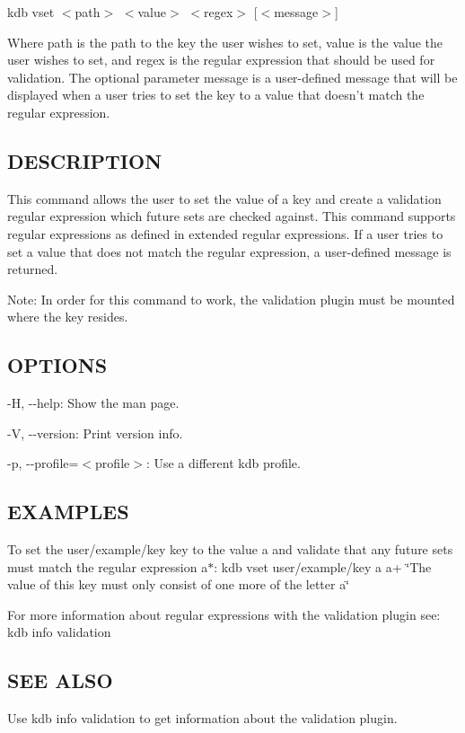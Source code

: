 {\ttfamily kdb vset $<$path$>$ $<$value$>$ $<$regex$>$ \mbox{[}$<$message$>$\mbox{]}}

Where {\ttfamily path} is the path to the key the user wishes to set, {\ttfamily value} is the value the user wishes to set, and {\ttfamily regex} is the regular expression that should be used for validation. The optional parameter {\ttfamily message} is a user-\/defined message that will be displayed when a user tries to set the key to a value that doesn't match the regular expression.

\subsection*{D\+E\+S\+C\+R\+I\+P\+T\+I\+O\+N}

This command allows the user to set the value of a key and create a validation regular expression which future sets are checked against. This command supports regular expressions as defined in extended regular expressions. If a user tries to set a value that does not match the regular expression, a user-\/defined message is returned.

Note\+: In order for this command to work, the {\ttfamily validation} plugin must be mounted where the key resides.

\subsection*{O\+P\+T\+I\+O\+N\+S}


\begin{DoxyItemize}
\item {\ttfamily -\/\+H}, {\ttfamily -\/-\/help}\+: Show the man page.
\item {\ttfamily -\/\+V}, {\ttfamily -\/-\/version}\+: Print version info.
\item {\ttfamily -\/p}, {\ttfamily -\/-\/profile}=$<$profile$>$\+: Use a different kdb profile.
\end{DoxyItemize}

\subsection*{E\+X\+A\+M\+P\+L\+E\+S}

To set the {\ttfamily user/example/key} key to the value {\ttfamily a} and validate that any future sets must match the regular expression {\ttfamily a$\ast$}\+: {\ttfamily kdb vset user/example/key a a+ \char`\"{}\+The value of this key must only consist of one more of the letter a\char`\"{}}

For more information about regular expressions with the {\ttfamily validation} plugin see\+: {\ttfamily kdb info validation}

\subsection*{S\+E\+E A\+L\+S\+O}


\begin{DoxyItemize}
\item Use {\ttfamily kdb info validation} to get information about the validation plugin. 
\end{DoxyItemize}